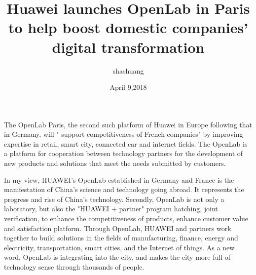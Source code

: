 \documentclass{article}
\author{shashuang}
\date{April 9,2018}
\title{Huawei launches OpenLab in Paris to help boost domestic companies' digital transformation}
\begin{document}
\maketitle


  The OpenLab Paris, the second such platform of Huawei in Europe following that in Germany, will " support competitiveness of French companies" by improving expertise in retail, smart city, connected car and internet fields. The OpenLab is a platform for cooperation between technology partners for the development of new products and solutions that meet the needs submitted by customers.



  In my view, HUAWEI's OpenLab established in Germany and France is the manifestation of China's science and technology going abroad. It represents the progress and rise of China's technology. Secondly, OpenLab is not only a laboratory, but also the "HUAWEI + partner" program hatching, joint verification, to enhance the competitiveness of products, enhance customer value and satisfaction platform. Through OpenLab, HUAWEI and partners work together to build solutions in the fields of manufacturing, finance, energy and electricity, transportation, smart cities, and the Internet of things. As a new word, OpenLab is integrating into the city, and makes the city more full of technology sense through thousands of people.
\end{document}
